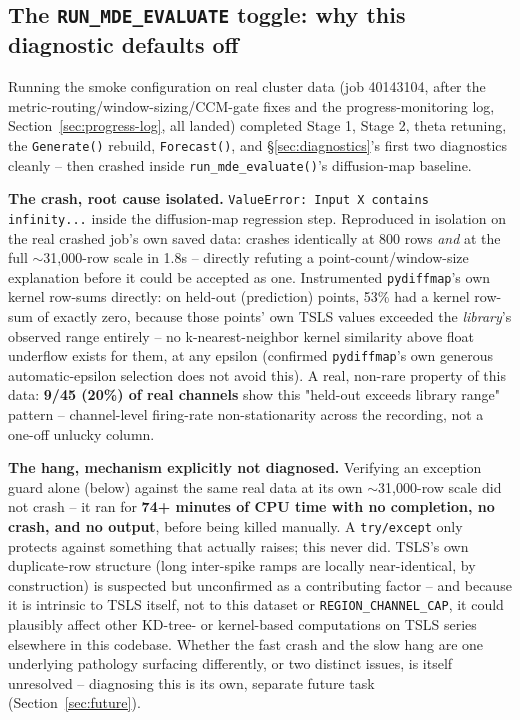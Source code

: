 \documentclass[11pt]{article}
\begin{document}
\subsection{The \texttt{RUN\_MDE\_EVALUATE} toggle: why this diagnostic defaults off}
\label{sec:mde-evaluate-toggle}
Running the smoke configuration on real cluster data (job 40143104, after the metric-routing/window-sizing/CCM-gate fixes and the progress-monitoring log, Section~\ref{sec:progress-log}, all landed) completed Stage 1, Stage 2, theta retuning, the \texttt{Generate()} rebuild, \texttt{Forecast()}, and \S\ref{sec:diagnostics}'s first two diagnostics cleanly -- then crashed inside \texttt{run\_mde\_evaluate()}'s diffusion-map baseline.
\begin{steps}
\item \textbf{The crash, root cause isolated.} \texttt{ValueError: Input X contains infinity...} inside the diffusion-map regression step. Reproduced in isolation on the real crashed job's own saved data: crashes identically at 800 rows \emph{and} at the full $\sim$31{,}000-row scale in 1.8s -- directly refuting a point-count/window-size explanation before it could be accepted as one. Instrumented \texttt{pydiffmap}'s own kernel row-sums directly: on held-out (prediction) points, 53\% had a kernel row-sum of exactly zero, because those points' own TSLS values exceeded the \emph{library}'s observed range entirely -- no k-nearest-neighbor kernel similarity above float underflow exists for them, at any epsilon (confirmed \texttt{pydiffmap}'s own generous automatic-epsilon selection does not avoid this). A real, non-rare property of this data: \textbf{9/45 (20\%) of real channels} show this "held-out exceeds library range" pattern -- channel-level firing-rate non-stationarity across the recording, not a one-off unlucky column.
\item \textbf{The hang, mechanism explicitly not diagnosed.} Verifying an exception guard alone (below) against the same real data at its own $\sim$31{,}000-row scale did not crash -- it ran for \textbf{74+ minutes of CPU time with no completion, no crash, and no output}, before being killed manually. A \texttt{try/except} only protects against something that actually raises; this never did. TSLS's own duplicate-row structure (long inter-spike ramps are locally near-identical, by construction) is suspected but unconfirmed as a contributing factor -- and because it is intrinsic to TSLS itself, not to this dataset or \texttt{REGION\_CHANNEL\_CAP}, it could plausibly affect other KD-tree- or kernel-based computations on TSLS series elsewhere in this codebase. Whether the fast crash and the slow hang are one underlying pathology surfacing differently, or two distinct issues, is itself unresolved -- diagnosing this is its own, separate future task (Section~\ref{sec:future}).
\end{steps}
\end{document}
